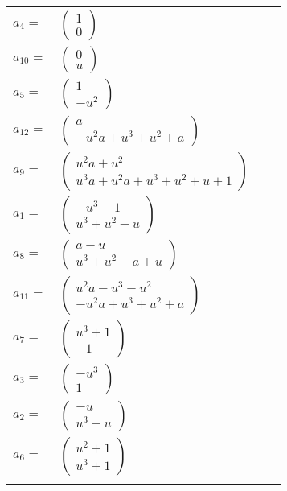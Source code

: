 \documentclass[1p]{elsarticle_modified}
\theoremstyle{definition}
\begin{document}
\begin{tabular}{m{7pt} m{180pt} m{7pt} m{180pt} }
\flushright $a_{4}=$&$\begin{pmatrix}1\\0\end{pmatrix}$ \\
\flushright $a_{10}=$&$\begin{pmatrix}0\\u\end{pmatrix}$ \\
\flushright $a_{5}=$&$\begin{pmatrix}1\\- u^2\end{pmatrix}$ \\
\flushright $a_{12}=$&$\begin{pmatrix}a\\- u^2 a+u^3+u^2+a\end{pmatrix}$ \\
\flushright $a_{9}=$&$\begin{pmatrix}u^2 a+u^2\\u^3 a+u^2 a+u^3+u^2+u+1\end{pmatrix}$ \\
\flushright $a_{1}=$&$\begin{pmatrix}- u^3-1\\u^3+u^2- u\end{pmatrix}$ \\
\flushright $a_{8}=$&$\begin{pmatrix}a- u\\u^3+u^2- a+u\end{pmatrix}$ \\
\flushright $a_{11}=$&$\begin{pmatrix}u^2 a- u^3- u^2\\- u^2 a+u^3+u^2+a\end{pmatrix}$ \\
\flushright $a_{7}=$&$\begin{pmatrix}u^3+1\\-1\end{pmatrix}$ \\
\flushright $a_{3}=$&$\begin{pmatrix}- u^3\\1\end{pmatrix}$ \\
\flushright $a_{2}=$&$\begin{pmatrix}- u\\u^3- u\end{pmatrix}$ \\
\flushright $a_{6}=$&$\begin{pmatrix}u^2+1\\u^3+1\end{pmatrix}$\\&\end{tabular}
\end{document}
